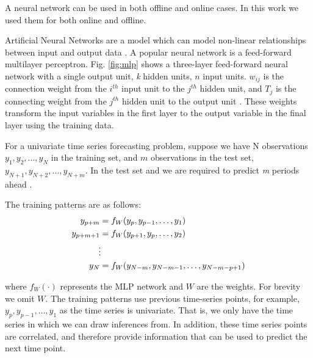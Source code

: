 \documentclass[final,3p,times,twocolumn,numbers]{elsarticle}
\begin{document}
A neural network can be used in both offline and online cases. In this work we used them for both online and offline.

Artificial Neural Networks are a model which can model non-linear relationships between input and output data \cite{Akaike1974}. A popular neural network is a feed-forward multilayer perceptron. Fig. \ref{fig:mlp} shows a three-layer feed-forward neural network with a single output unit, \textit{k} hidden units, $n$ input units. $w_{ij}$ is the connection weight from the $i^{th}$ input unit to the $j^{th}$ hidden unit,  and $T_j$ is the connecting weight from the $j^{th}$ hidden unit to the output unit \cite{Pao2007}. These weights transform the input variables in the first layer to the output variable in the final layer using the training data. 


For a univariate time series forecasting problem, suppose we have N observations $y_1, y_2, \ldots, y_N$ in the training set, and $m$ observations in the test set, $y_{N+1}, y_{N+2}, \ldots, y_{N+m}$. In the test set and we are required to predict \textit{m} periods ahead \cite{Pao2007}. 

The training patterns are as follows:
\begin{align}
y_{p+m} & =f_{W}(y_p, y_{p-1},\ldots,y_1)\\
y_{p+m+1} & =f_{W}(y_{p+1}, y_{p},\ldots,y_2)\\
&\vdotswithin  \notag \\
y_{N} & =f_{W}(y_{N-m},y_{N-m-1},\ldots,y_{N-m-p+1})
\end{align}

\noindent where $f_{W}(\cdot)$ represents the MLP network and $W$ are the weights. For brevity we omit $W$. The training patterns use previous time-series points, for example, $y_p, y_{p-1},\ldots,y_1$ as the time series is univariate. That is, we only have the time series in which we can draw inferences from. In addition, these time series points are correlated, and therefore provide information that can be used to predict the next time point.
\end{document}

